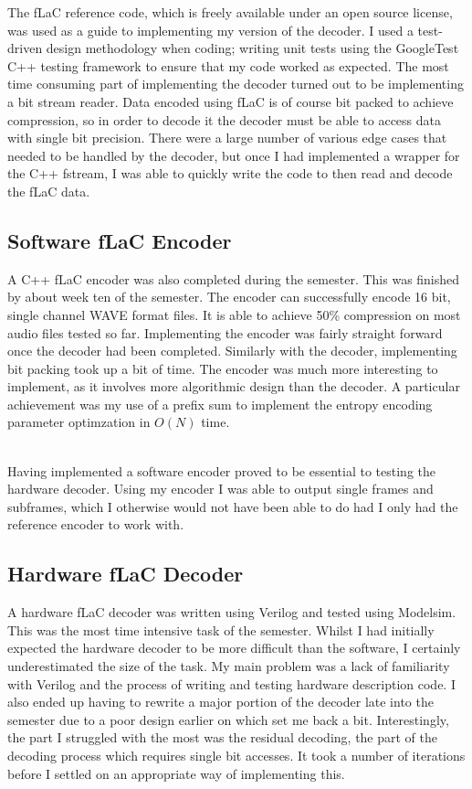 \documentclass[12pt]{scrartcl}
\begin{document}
  The fLaC reference code, which is freely available under an open source license, was used as a guide to implementing my version of the decoder. I used a test-driven design methodology when coding; writing unit tests using the GoogleTest C++ testing framework to ensure that my code worked as expected. The most time consuming part of implementing the decoder turned out to be implementing a bit stream reader. Data encoded using fLaC is of course bit packed to achieve compression, so in order to decode it the decoder must be able to access data with single bit precision. There were a large number of various edge cases that needed to be handled by the decoder, but once I had implemented a wrapper for the C++ fstream, I was able to quickly write the code to then read and decode the fLaC data.
  
  \subsection{Software fLaC Encoder}
  A C++ fLaC encoder was also completed during the semester. This was finished by about week ten of the semester. The encoder can successfully encode 16 bit, single channel WAVE format files. It is able to achieve 50\% compression on most audio files tested so far. Implementing the encoder was fairly straight forward once the decoder had been completed. Similarly with the decoder, implementing bit packing took up a bit of time. The encoder was much more interesting to implement, as it involves more algorithmic design than the decoder. A particular achievement was my use of a prefix sum to implement the entropy encoding parameter optimzation in \(O(N)\) time. \\\
  
  Having implemented a software encoder proved to be essential to testing the hardware decoder. Using my encoder I was able to output single frames and subframes, which I otherwise would not have been able to do had I only had the reference encoder to work with.
  
  \subsection{Hardware fLaC Decoder}
  A hardware fLaC decoder was written using Verilog and tested using Modelsim. This was the most time intensive task of the semester. Whilst I had initially expected the hardware decoder to be more difficult than the software, I certainly underestimated the size of the task. My main problem was a lack of familiarity with Verilog and the process of writing and testing hardware description code. I also ended up having to rewrite a major portion of the decoder late into the semester due to a poor design earlier on which set me back a bit. Interestingly, the part I struggled with the most was the residual decoding, the part of the decoding process which requires single bit accesses. It took a number of iterations before I settled on an appropriate way of implementing this.\\
  
\end{document}
